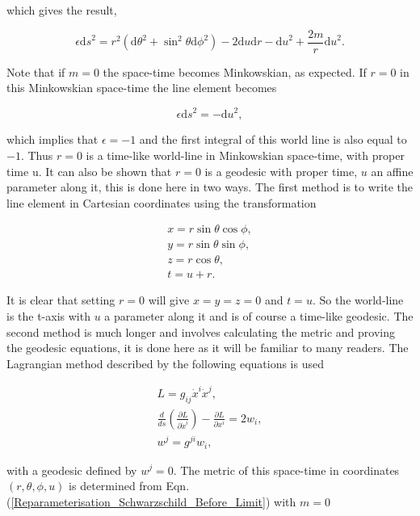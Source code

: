 \noindent which gives the result,

\begin{equation}\label{Reparameterisation_Schwarzschild_Before_Limit}
\epsilon {\mathrm{d}s}^{2} = r^2 ({\mathrm{d}\theta}^2 + {{\sin}^2 \theta}{\mathrm{d} \phi}^2) - 2 \mathrm{d}u \mathrm{d}r - {\mathrm{d}u}^{2} + \frac{2m}{r} {\mathrm{d}u}^{2}. 
\end{equation}

Note that if $m = 0$ the space-time becomes Minkowskian, as expected. If $r = 0$ in this Minkowskian space-time the line element becomes

$$ \epsilon {\mathrm{d}s}^2 = - {\mathrm{d}u}^{2},$$

\noindent which implies that $\epsilon = -1$ and the first integral of this world line is also equal to $-1$. Thus $r = 0$ is a time-like world-line in Minkowskian space-time, with proper time u. It can also be shown that $r=0$ is a geodesic with proper time, $u$ an affine parameter along it, this is done here in two ways. The first method is to write the line element in Cartesian coordinates using the transformation

\begin{gather*} 
x = r\sin{\theta}\cos{\phi}, \\
y = r\sin{\theta}\sin{\phi}, \\
z = r\cos{\theta}, \\
t = u + r.
\end{gather*}

\noindent It is clear that setting $r=0$ will give $x = y = z = 0$ and $t = u$. So the world-line is the t-axis with $u$ a parameter along it and is of course a time-like geodesic. The second method is much longer and involves calculating the metric and proving the geodesic equations, it is done here as it will be familiar to many readers. The Lagrangian method described by the following equations is used

\begin{gather*}
L = g_{ij} \dot{x}^{i}\dot{x}^{j},\\
\frac{d}{ds}\left( \frac{\partial L}{\partial \dot{x}^{i}}\right) - \frac{\partial L}{\partial {x}^{i}} = 2 w_{i}, \\
w^{j} = g^{ji}w_{i},  
\end{gather*}

\noindent with a geodesic defined by $w^{j} = 0$. The metric of this space-time in coordinates $(r ,\theta, \phi, u)$ is determined from Eqn.(\ref{Reparameterisation_Schwarzschild_Before_Limit}) with $m=0$

